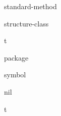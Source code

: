 \begin{class}{standard-method}{}
  
\end{class}

\begin{class}{structure-class}{}
  
\end{class}

\begin{class}{t}{}
  
\end{class}

\begin{class}{package}{}
  
\end{class}

\begin{class}{symbol}{}
  
\end{class}

\begin{constant}{nil}{}
  
\end{constant}

\begin{constant}{t}{}
  
\end{constant}



